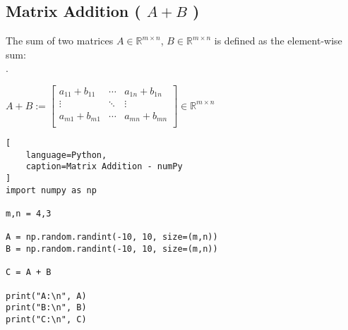 \subsection{Matrix Addition ( $A+B$ ) \cite{mfml/book/mml/Deisenroth-Faisal-Ong}}

The sum of two matrices $A \in \mathbb{R}^{m\times n}$, $B \in \mathbb{R}^{m\times n}$ is defined as the element-wise sum:\\
. \hfill
\begin{customArrayStretch}{2}
$
    A + B
    := \begin{bmatrix}
        a_{11} + b_{11} &   \cdots  &  a_{1n} + b_{1n} \\
        \vdots          &   \ddots  &   \vdots  \\
        a_{m1} + b_{m1} &   \cdots  &  a_{mn} + b_{mn} \\
    \end{bmatrix}
    \in \mathbb{R}^{m\times n}
$
\end{customArrayStretch}
\hfill \cite{mfml/book/mml/Deisenroth-Faisal-Ong}







\begin{lstlisting}[
    language=Python,
    caption=Matrix Addition - numPy
]
import numpy as np

m,n = 4,3

A = np.random.randint(-10, 10, size=(m,n))
B = np.random.randint(-10, 10, size=(m,n))

C = A + B

print("A:\n", A)
print("B:\n", B)
print("C:\n", C)
\end{lstlisting}








